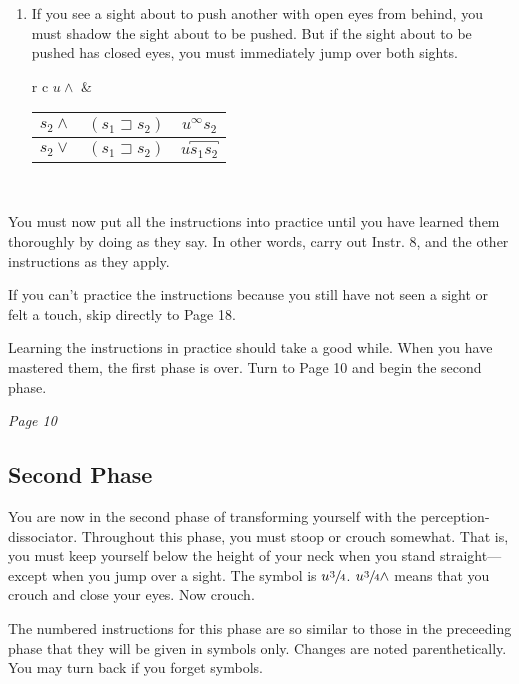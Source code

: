 \documentclass[10pt,twoside,draft]{memoir}
\begin{document}
{{\begin{enumerate}
\item If you see a sight about to push another with open eyes from 
behind, you must shadow the sight about to be pushed. But if the sight 
about to be pushed has closed eyes, you must immediately jump over both 
sights. 

\begin{tabular}{ r c }
	$u\wedge$ & \begin{tabular}{ c c c }
		$s_2\wedge$ & $(s_1\sqsupset s_2)$ & $u^\infty s_2$ \\ \midrule
		$s_2\vee$ & $(s_1\sqsupset s_2)$ & $u\overbracket{s_1s_2}$ \\
	\end{tabular} \\
\end{tabular}
\end{enumerate}

You must now put all the instructions into practice until you have 
learned them thoroughly by doing as they say. In other words, carry out 
Instr. 8, and the other instructions as they apply. 

If you can't practice the instructions because you still have not seen a 
sight or felt a touch, skip directly to Page 18. 

Learning the instructions in practice should take a good while. When 
you have mastered them, the first phase is over. Turn to Page 10 and begin 
the second phase. 

\clearpage

{\centering \textit{Page 10} \par}

\subsection*{Second Phase}

You are now in the second phase of transforming yourself with the 
perception-dissociator. Throughout this phase, you must stoop or crouch 
somewhat. That is, you must keep yourself below the height of your neck 
when you stand straight---except when you jump over a sight. The symbol is 
$u\sfrac{3}{4}$. $u\sfrac{3}{4}\wedge$ means that you crouch and close your eyes. Now crouch. 

The numbered instructions for this phase are so similar to those in the 
preceeding phase that they will be given in symbols only. Changes are noted 
parenthetically. You may turn back if you forget symbols. 

}}
\end{document}
